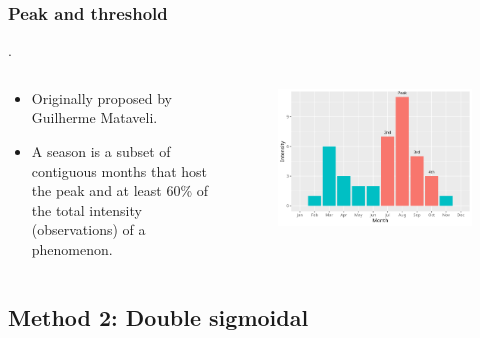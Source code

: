 \documentclass[aspectratio=169]{beamer}
\begin{document}
\begin{frame}
    \frametitle{Peak and threshold}.
    \begin{columns}
        \begin{column}{0.5\linewidth}
            \begin{itemize}
                \item Originally proposed by Guilherme Mataveli.
                \item A season is a subset of contiguous months that host the
                    peak and at least 60\% of the total intensity
                    (observations) of a phenomenon.
            \end{itemize}
        \end{column}
        \begin{column}{0.5\linewidth}
            \begin{figure}[h]
                \includegraphics[width=0.99\linewidth]
                {./images/peak_thres_hist.png}
            \end{figure}
        \end{column}
    \end{columns}
\end{frame}

\subsection{Method 2: Double sigmoidal}
\end{document}
